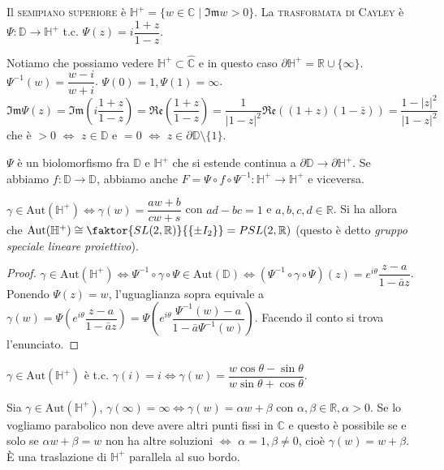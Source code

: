 \begin{defn}
  Il \textsc{semipiano superiore} è $\mathbb{H}^+=\{w \in \mathbb{C} \mid \mathfrak{Im}w>0\}$. La \textsc{trasformata di Cayley} è $\Psi:\mathbb{D} \longrightarrow \mathbb{H}^+$ t.c. $\Psi(z)=i\dfrac{1+z}{1-z}$.
\end{defn}

Notiamo che possiamo vedere $\mathbb{H}^+ \subset \hat{\mathbb{C}}$ e in questo caso $\partial\mathbb{H}^+=\mathbb{R}\cup\{\infty\}$. $\Psi^{-1}(w)=\dfrac{w-i}{w+i}$. $\Psi(0)=1, \Psi(1)=\infty$. \\
$\mathfrak{Im}\Psi(z)=\mathfrak{Im}\left(i\dfrac{1+z}{1-z}\right)=\mathfrak{Re}\left(\dfrac{1+z}{1-z}\right)=\dfrac{1}{|1-z|^2}\mathfrak{Re}((1+z)(1-\bar{z}))=\dfrac{1-|z|^2}{|1-z|^2}$ che è $>0$ $\iff$ $z \in \mathbb{D}$ e $=0$ $\iff$ $z \in \partial\mathbb{D}\setminus\{1\}$.

$\Psi$ è un biolomorfismo fra $\mathbb{D}$ e $\mathbb{H}^+$ che si estende continua a $\partial\mathbb{D} \longrightarrow \partial\mathbb{H}^+$. Se abbiamo $f: \mathbb{D} \longrightarrow \mathbb{D}$, abbiamo anche $F=\Psi \circ f \circ \Psi^{-1}:\mathbb{H}^+ \longrightarrow \mathbb{H}^+$ e viceversa.

\begin{cor}
  $\gamma \in \text{Aut}(\mathbb{H}^+) \iff \gamma(w)=\dfrac{aw+b}{cw+s}$ con $ad-bc=1$ e $a, b, c, d \in \mathbb{R}$. Si ha allora che $\text{Aut}(\mathbb{H}^+) \cong \faktor{SL(2, \mathbb{R})}{\{\pm I_2\}}=PSL(2, \mathbb{R})$ (questo è detto \textit{gruppo speciale lineare proiettivo}).
\end{cor}

\begin{proof}
  $\gamma \in \text{Aut}(\mathbb{H}^+) \iff \Psi^{-1} \circ \gamma \circ \Psi \in \text{Aut}(\mathbb{D}) \iff (\Psi^{-1} \circ \gamma \circ \Psi)(z)=e^{i\theta}\dfrac{z-a}{1-\bar{a}z}$.
  Ponendo $\Psi(z)=w$, l'uguaglianza sopra equivale a $\gamma(w)=\Psi\left(e^{i\theta}\dfrac{z-a}{1-\bar{a}z}\right)=\Psi\left(e^{i\theta}\dfrac{\Psi^{-1}(w)-a}{1-\bar{a}\Psi^{-1}(w)}\right)$. Facendo il conto si trova l'enunciato.
\end{proof}

\begin{exc}
  $\gamma \in \text{Aut}(\mathbb{H}^+)$ è t.c. $\gamma(i)=i \iff \gamma(w)=\dfrac{w\cos{\theta}-\sin{\theta}}{w\sin{\theta}+\cos{\theta}}$.
\end{exc}

\begin{ex}
  Sia $\gamma \in \text{Aut}(\mathbb{H}^+)$, $\gamma(\infty)=\infty \iff \gamma(w)=\alpha w+\beta$ con $\alpha, \beta \in \mathbb{R}, \alpha>0$.
  Se lo vogliamo parabolico non deve avere altri punti fissi in $\mathbb{C}$ e questo è possibile se e solo se $\alpha w+\beta=w$ non ha altre soluzioni $\iff$ $\alpha=1, \beta \not=0$, cioè $\gamma(w)=w+\beta$.
  È una traslazione di $\mathbb{H}^+$ parallela al suo bordo.
\end{ex}

